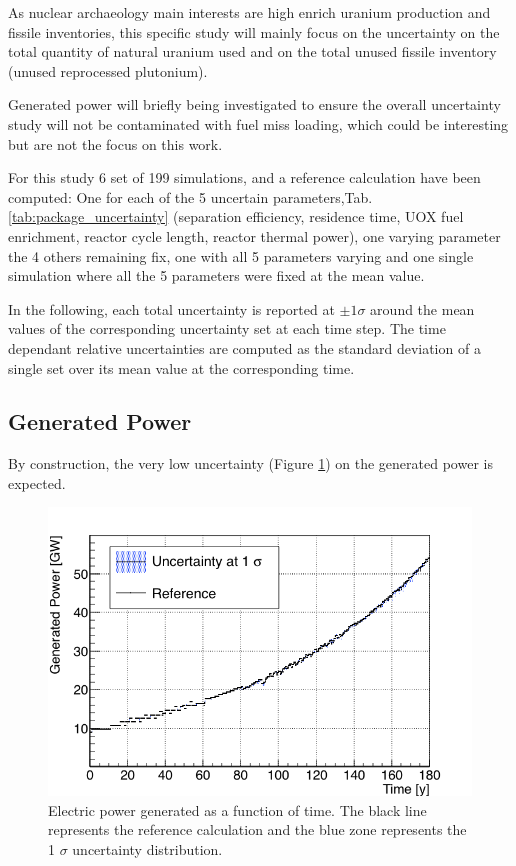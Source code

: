 \documentclass{anstrans}
\begin{document}
As nuclear archaeology main interests are high enrich uranium production and
fissile inventories, this specific study will mainly focus on the uncertainty on
the total quantity of natural uranium used and on the total unused fissile
inventory (unused reprocessed plutonium).  

Generated power will briefly being investigated to ensure the overall
uncertainty study will not be contaminated with fuel miss loading, which could
be interesting but are not the focus on this work.

For this study 6 set of 199 simulations, and a reference calculation have been
computed: One for each of the 5 uncertain parameters,Tab.
\ref{tab:package_uncertainty}  (separation efficiency, residence time, UOX fuel
enrichment, reactor cycle length, reactor thermal power), one varying parameter
the 4 others remaining fix, one with all 5 parameters varying and one single
simulation where all the 5 parameters were fixed at the mean value.  

In the following, each total uncertainty is reported at $\pm1\sigma$ around the
mean values of the corresponding uncertainty set at each time step.  The time
dependant relative uncertainties are computed as the standard deviation of a
single set over its mean value at the corresponding time.


\subsection{Generated Power}

By construction, the very low uncertainty (Figure \ref{fig:power_full}) on the
generated power is expected.

\begin{figure}[h!] %
    \centering
    \includegraphics[scale=0.36]{power_full}
    \caption{Electric power generated as a function of time.  The black line
        represents the reference calculation and the blue zone
        represents the 1 $\sigma$ uncertainty distribution.}\label{fig:power_full}
\end{figure}
\end{document}
